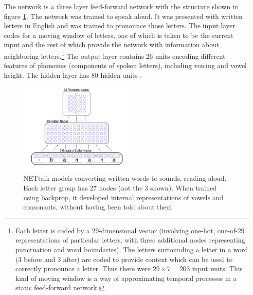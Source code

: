 The network is a three layer feed-forward network with the structure shown in figure \ref{net_talk}.  The network was trained to speak aloud. It was presented with written letters in English and was trained to pronounce those letters. The input layer codes for a moving window of letters, one of which is taken to be the current input and the rest of which provide the network with information about neighboring letters.\footnote{Each letter is coded by a 29-dimensional vector (involving one-hot, one-of-29 representations of particular letters, with three additional nodes representing punctuation and word boundaries). The letters surrounding a letter in a word (3 before and 3 after) are coded to provide context which can be used to  correctly pronounce a letter. Thus there were $29 \times 7 = 203$ input units. This kind of moving window is a way of approximating temporal processes in a static feed-forward network.} The output layer contains 26 units encoding different features of phonemes (components of spoken letters), including voicing and vowel height. The hidden layer has 80 hidden units \cite{sejnowski1987parallel}. 

\begin{figure}[h]
\centering
\includegraphics[width=0.5\textwidth]{images/net_talk.png}
\caption[Pamela Payne.]{NETtalk models converting written words to sounds, \ie reading aloud. Each letter group has 27 nodes (not the 3 shown). When trained using backprop, it developed internal representations of vowels and consonants, without having been told about them.}
\label{net_talk}
\end{figure}

